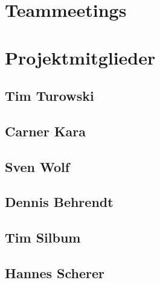 



\section{Teammeetings}

\newpage
\section{Projektmitglieder}
\subsection{Tim Turowski}

\newpage
\subsection{Carner Kara}

\newpage
\subsection{Sven Wolf}

\newpage
\subsection{Dennis Behrendt}

\newpage
\subsection{Tim Silbum}

\newpage
\subsection{Hannes Scherer}


